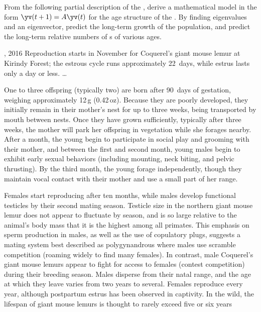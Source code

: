 \begin{reduce}
\begin{exercise}  
From the following partial description of the , 
derive a mathematical model in the form \(\yv(t+1)=A\yv(t)\) for the age structure of the .
By finding eigenvalues and an eigenvector, predict the long-term growth of the population, and predict the long-term relative numbers of s of various ages.
\begin{quoted}{, 2016}
Reproduction starts in November for Coquerel's giant mouse lemur at Kirindy Forest; the estrous cycle runs approximately 22~days, while estrus lasts only a day or less. \ldots

One to three offspring (typically two) are born after 90~days of gestation, weighing approximately 12\,g (0.42\,oz). Because they are poorly developed, they initially remain in their mother's nest for up to three weeks, being transported by mouth between nests. Once they have grown sufficiently, typically after three weeks, the mother will park her offspring in vegetation while she forages nearby. After a month, the young begin to participate in social play and grooming with their mother, and between the first and second month, young males begin to exhibit early sexual behaviors (including mounting, neck biting, and pelvic thrusting). By the third month, the young forage independently, though they maintain vocal contact with their mother and use a small part of her range.

Females start reproducing after ten months, while males develop functional testicles by their second mating season. Testicle size in the northern giant mouse lemur does not appear to fluctuate by season, and is so large relative to the animal's body mass that it is the highest among all primates. This emphasis on sperm production in males, as well as the use of copulatory plugs, suggests a mating system best described as polygynandrous where males use scramble competition (roaming widely to find many females). In contrast, male Coquerel's giant mouse lemurs appear to fight for access to females (contest competition) during their breeding season. Males disperse from their natal range, and the age at which they leave varies from two years to several. Females reproduce every year, although postpartum estrus has been observed in captivity. In the wild, the lifespan of giant mouse lemurs is thought to rarely exceed five or six years
\end{quoted}
\end{exercise}
\end{reduce}




